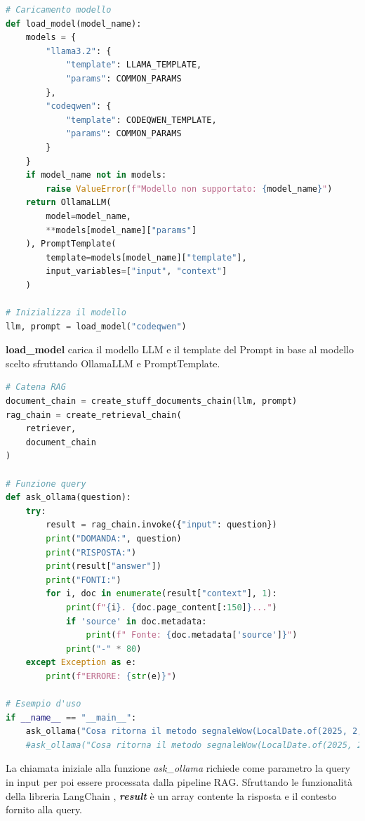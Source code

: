 \documentclass[12pt,a4paper,openright,twoside]{book}
\begin{document}
\begin{lstlisting}[language=Python, caption={Caricamento del modello}, label={lst:Caricamento del modello}]
    # Caricamento modello
def load_model(model_name):
    models = {
        "llama3.2": {
            "template": LLAMA_TEMPLATE,
            "params": COMMON_PARAMS
        },
        "codeqwen": {
            "template": CODEQWEN_TEMPLATE,
            "params": COMMON_PARAMS
        }
    }
    if model_name not in models:
        raise ValueError(f"Modello non supportato: {model_name}")
    return OllamaLLM(
        model=model_name,
        **models[model_name]["params"]
    ), PromptTemplate(
        template=models[model_name]["template"],
        input_variables=["input", "context"]
    )

# Inizializza il modello
llm, prompt = load_model("codeqwen")
\end{lstlisting}
\textbf{load\_model} carica il modello LLM e il template del Prompt in base al modello scelto sfruttando OllamaLLM e PromptTemplate.
\begin{lstlisting}[language=Python, caption={Catena RAG}, label={lst:Catena RAG}]
# Catena RAG
document_chain = create_stuff_documents_chain(llm, prompt)
rag_chain = create_retrieval_chain(
    retriever,
    document_chain
)

# Funzione query
def ask_ollama(question):
    try:
        result = rag_chain.invoke({"input": question})
        print("DOMANDA:", question)
        print("RISPOSTA:")
        print(result["answer"])
        print("FONTI:")
        for i, doc in enumerate(result["context"], 1):
            print(f"{i}. {doc.page_content[:150]}...")
            if 'source' in doc.metadata:
                print(f" Fonte: {doc.metadata['source']}")
            print("-" * 80)
    except Exception as e:
        print(f"ERRORE: {str(e)}")

# Esempio d'uso
if __name__ == "__main__":
    ask_ollama("Cosa ritorna il metodo segnaleWow(LocalDate.of(2025, 2, 14)) che utilizza la funzione getMessaggioMagico() della libreria DateUtilCustom?")
    #ask_ollama("Cosa ritorna il metodo segnaleWow(LocalDate.of(2025, 2, 14))?")

\end{lstlisting}
La chiamata iniziale alla funzione \emph{ask\_ollama} richiede come parametro la query in input per poi essere processata dalla pipeline RAG.
Sfruttando le funzionalità della libreria LangChain \cite{langchain-retrieval-chain}, \textbf{\emph{result}} è un array contente la risposta e il contesto fornito alla query.
\end{document}

